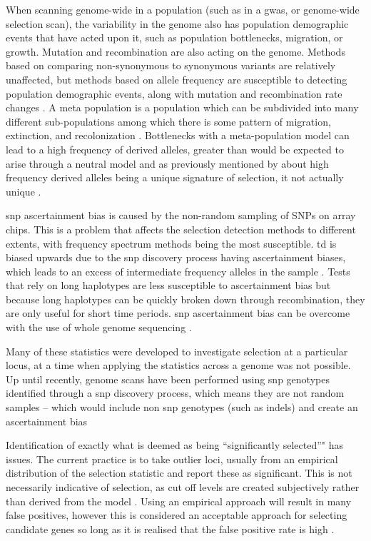\documentclass[]{report}
\begin{document}
When scanning genome-wide in a population (such as in a \gls{gwas}, or
genome-wide selection scan), the variability in the genome also has
population demographic events that have acted upon it, such as
population bottlenecks, migration, or growth. Mutation and recombination
are also acting on the genome. Methods based on comparing non-synonymous
to synonymous variants are relatively unaffected, but methods based on
allele frequency are susceptible to detecting population demographic
events, along with mutation and recombination rate changes
\citep{Nielsen2009}. A meta population is a population which can be
subdivided into many different sub-populations among which there is some
pattern of migration, extinction, and recolonization
\citep{Wakeley2001}. Bottlenecks with a meta-population model can lead
to a high frequency of derived alleles, greater than would be expected
to arise through a neutral model \citep{Jensen2005} and as previously
mentioned by \citet{fay2000hitchhiking} about high frequency derived
alleles being a unique signature of selection, it not actually unique
\citep{Przeworski2002}.

\Gls{snp} ascertainment bias is caused by the non-random sampling of
SNPs on array chips. This is a problem that affects the selection
detection methods to different extents, with frequency spectrum methods
being the most susceptible. \Gls{td} is biased upwards due to the
\gls{snp} discovery process having ascertainment biases, which leads to
an excess of intermediate frequency alleles in the sample
\citep{Kelley2006}. Tests that rely on long haplotypes are less
susceptible to ascertainment bias \citep{sabeti2006positive} but because
long haplotypes can be quickly broken down through recombination, they
are only useful for short time periods. \Gls{snp} ascertainment bias can
be overcome with the use of whole genome sequencing
\citep{Albrechtsen2010}.

Many of these statistics were developed to investigate selection at a
particular locus, at a time when applying the statistics across a genome
was not possible. Up until recently, genome scans have been performed
using \gls{snp} genotypes identified through a \gls{snp} discovery
process, which means they are not random samples -- which would include
non \gls{snp} genotypes (such as \glspl{indel}) and create an
ascertainment bias \citep{Nielsen2005a}

Identification of exactly what is deemed as being ``significantly
selected''" has issues. The current practice is to take outlier loci,
usually from an empirical distribution of the selection statistic and
report these as significant. This is not necessarily indicative of
selection, as cut off levels are created subjectively rather than
derived from the model \citep{Qanbari2012a}. Using an empirical approach
will result in many false positives, however this is considered an
acceptable approach for selecting candidate genes so long as it is
realised that the false positive rate is high \citep{Kelley2006}.
\end{document}
